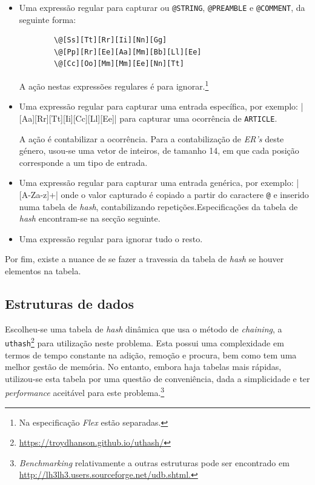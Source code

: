 \begin{itemize}
	\item Uma expressão regular para capturar ou \texttt{@STRING},
		\texttt{@PREAMBLE} e \texttt{@COMMENT}, da seguinte forma:
\begin{verbatim}
		\@[Ss][Tt][Rr][Ii][Nn][Gg]
		\@[Pp][Rr][Ee][Aa][Mm][Bb][Ll][Ee]
		\@[Cc][Oo][Mm][Mm][Ee][Nn][Tt]
\end{verbatim}

A ação nestas expressões regulares é para ignorar.\footnote{Na especificação
	\emph{Flex} estão separadas.}


	\item Uma expressão regular para capturar uma entrada específica, por exemplo:
		|\@[Aa][Rr][Tt][Ii][Cc][Ll][Ee]| para capturar uma ocorrência de
		\texttt{ARTICLE}.

		A ação é contabilizar a ocorrência. Para a contabilização de \emph{ER's}
		deste género, usou-se uma vetor de inteiros, de tamanho 14, em que cada
		posição corresponde a um tipo de entrada.
\newpage

	\item Uma expressão regular para capturar uma entrada genérica, por exemplo:
		|\@[A-Za-z]+| onde o valor capturado é copiado a partir do
		caractere \texttt{@} e inserido numa tabela de
		\emph{hash}, contabilizando repetições.Especificações da tabela de
			\emph{hash} encontram-se na secção seguinte.
	\item Uma expressão regular para ignorar tudo o resto.

\end{itemize}


Por fim, existe a nuance de se fazer a travessia da
tabela de \emph{hash} se houver elementos na tabela.


\subsection{Estruturas de dados}
\label{sec:subsec:es:a}
Escolheu-se uma tabela de \emph{hash} dinâmica que usa o método de
\emph{chaining},
a \texttt{uthash}\footnote{\url{https://troydhanson.github.io/uthash/}} para
utilização neste problema.  Esta possui uma complexidade em termos de tempo
constante na adição, remoção e procura, bem como tem uma melhor gestão de
memória. No entanto, embora haja tabelas mais rápidas, utilizou-se esta tabela
por uma questão de conveniência, dada a simplicidade e ter \emph{performance}
aceitável para este problema.\footnote{\emph{Benchmarking} relativamente
a outras estruturas pode ser encontrado em
\url{http://lh3lh3.users.sourceforge.net/udb.shtml.}}


